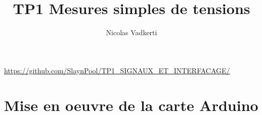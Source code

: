 \documentclass[10pt,a4paper]{article}
\title{TP1 Mesures simples de tensions}
\author{Nicolas Vadkerti}
\begin{document}
\maketitle


\url{https://github.com/SlaynPool/TP1_SIGNAUX_ET_INTERFACAGE/}
\section{Mise en oeuvre de la carte Arduino}
\end{document}
